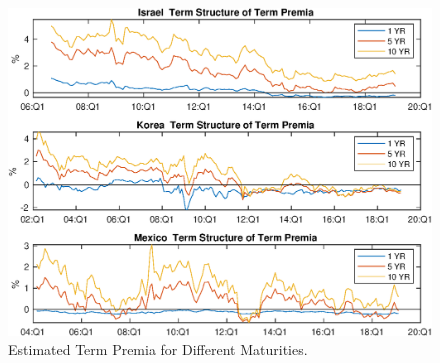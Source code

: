 	\begin{figure}[!htbp]
		\begin{centering}
			\vspace{12.5mm}
			\includegraphics[width=1\textwidth,height=0.8\textheight]{../Figures/Temp/temp_ts_tp}
			\par\end{centering}
		\caption{Estimated Term Premia for Different Maturities.}\label{fig:temp_ts_tp}
	\end{figure}